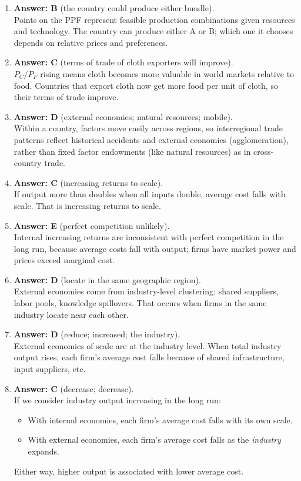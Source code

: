 \documentclass[12pt]{article}
\begin{document}
\begin{enumerate}[label=\textbf{\arabic*.}]
\item \textbf{Answer: B} (the country could produce either bundle).\\
Points on the PPF represent feasible production combinations given resources and technology. The country can produce either A or B; which one it chooses depends on relative prices and preferences.

\item \textbf{Answer: C} (terms of trade of cloth exporters will improve).\\
$P_C/P_F$ rising means cloth becomes more valuable in world markets relative to food. Countries that export cloth now get more food per unit of cloth, so their terms of trade improve.

\item \textbf{Answer: D} (external economies; natural resources; mobile).\\
Within a country, factors move easily across regions, so interregional trade patterns reflect historical accidents and external economies (agglomeration), rather than fixed factor endowments (like natural resources) as in cross-country trade.

\item \textbf{Answer: C} (increasing returns to scale).\\
If output more than doubles when all inputs double, average cost falls with scale. That is increasing returns to scale.

\item \textbf{Answer: E} (perfect competition unlikely).\\
Internal increasing returns are inconsistent with perfect competition in the long run, because average costs fall with output; firms have market power and prices exceed marginal cost.

\item \textbf{Answer: D} (locate in the same geographic region).\\
External economies come from industry-level clustering: shared suppliers, labor pools, knowledge spillovers. That occurs when firms in the same industry locate near each other.

\item \textbf{Answer: D} (reduce; increased; the industry).\\
External economies of scale are at the industry level. When total industry output rises, each firm’s average cost falls because of shared infrastructure, input suppliers, etc.

\item \textbf{Answer: C} (decrease; decrease).\\
If we consider industry output increasing in the long run:
\begin{itemize}
\item With internal economies, each firm’s average cost falls with its own scale.
\item With external economies, each firm’s average cost falls as the \emph{industry} expands.
\end{itemize}
Either way, higher output is associated with lower average cost.


\end{enumerate}
\end{document}
